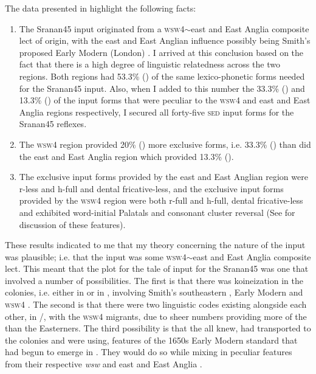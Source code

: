 The data presented in  highlight the following facts: 

\begin{enumerate}
\item{The Sranan45 input originated from a \textsc{wsw4}$\sim$east and East Anglia composite lect of origin, with the east and East Anglian influence possibly being Smith's proposed Early Modern (London)  \citep{Smith87, Smith08}. I arrived at this conclusion based on the fact that there is a high degree of linguistic relatedness across the two regions. Both regions had 53.3\% () of the same lexico-phonetic forms needed for the Sranan45 input. Also, when I added to this number the 33.3\% () and 13.3\% () of the input forms that were peculiar to the \textsc{wsw4} and east and East Anglia regions respectively, I secured all forty-five \textsc{sed} input forms for the Sranan45 reflexes.}
\item{The \textsc{wsw4} region provided 20\% () more exclusive  forms, i.e. 33.3\% () than did the east and East Anglia region which provided 13.3\% ().}
\item{The exclusive input forms provided by the east and East Anglian region were r-less and h-full and dental fricative-less, and the exclusive input forms provided by the \textsc{wsw4} region were both r-full and h-full, dental fricative-less and exhibited word-initial Palatals and consonant cluster reversal (See  for discussion of these features).}
\end{enumerate}

These results indicated to me that my theory concerning the nature of the input was plausible; i.e. that the input was some \textsc{wsw4}$\sim$east and East Anglia composite lect. This meant that the plot for the tale of  input for the Sranan45 was one that involved a number of possibilities. The first is that there was koineization in the colonies, i.e. either in  or in , involving Smith's southeastern , Early Modern  \citep{Smith87, Smith08} and \textsc{wsw4}  . The second is that there were two linguistic codes existing alongside each other, in /, with the \textsc{wsw4} migrants, due to sheer numbers providing more of the  than the Easterners. The third possibility is that the  all knew, had transported to the colonies and were using, features of the 1650s Early Modern  standard that had begun to emerge in  \citep{Smith87, Smith08}. They would do so while mixing in peculiar features from their respective \emph{wsw} and east and East Anglia .

